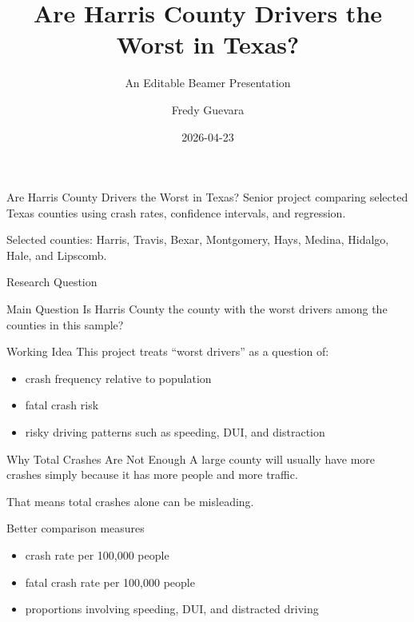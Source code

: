 \documentclass[
  ignorenonframetext,
  aspectratio=169]{beamer}
\title{Are Harris County Drivers the Worst in Texas?}
\subtitle{An Editable Beamer Presentation}
\author{Fredy Guevara}
\date{2026-04-23}
\providecommand{\tightlist}{%
  \setlength{\itemsep}{0pt}\setlength{\parskip}{0pt}}
\begin{document}
\frame{\titlepage}

\begin{frame}{}
\label{section}
\begin{block}{Are Harris County Drivers the Worst in Texas?}
\label{are-harris-county-drivers-the-worst-in-texas}
Senior project comparing selected Texas counties using crash rates,
confidence intervals, and regression.

\vspace{0.5cm}

Selected counties: Harris, Travis, Bexar, Montgomery, Hays, Medina,
Hidalgo, Hale, and Lipscomb.
\end{block}
\end{frame}

\begin{frame}{Research Question}
\label{research-question}
\begin{block}{Main Question}
\label{main-question}
Is Harris County the county with the worst drivers among the counties in
this sample?
\end{block}

\begin{block}{Working Idea}
\label{working-idea}
This project treats ``worst drivers'' as a question of:

\begin{itemize}
\tightlist
\item
  crash frequency relative to population
\item
  fatal crash risk
\item
  risky driving patterns such as speeding, DUI, and distraction
\end{itemize}
\end{block}
\end{frame}

\begin{frame}{Why Total Crashes Are Not Enough}
\label{why-total-crashes-are-not-enough}
A large county will usually have more crashes simply because it has more
people and more traffic.

That means total crashes alone can be misleading.

\begin{block}{Better comparison measures}
\label{better-comparison-measures}
\begin{itemize}
\tightlist
\item
  crash rate per 100,000 people
\item
  fatal crash rate per 100,000 people
\item
  proportions involving speeding, DUI, and distracted driving
\end{itemize}
\end{block}
\end{frame}
\end{document}
